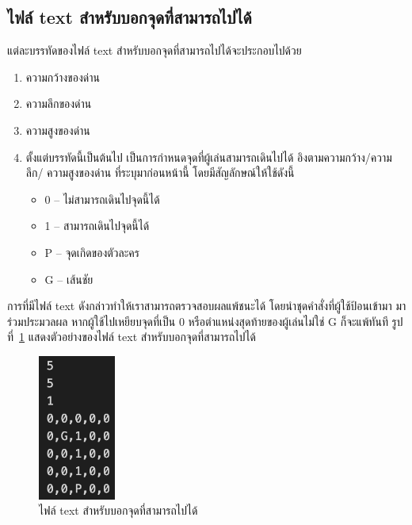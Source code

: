 \subsection{ไฟล์ text สำหรับบอกจุดที่สามารถไปได้}
แต่ละบรรทัดของไฟล์ text สำหรับบอกจุดที่สามารถไปได้จะประกอบไปด้วย
\begin{enumerate}
    \item ความกว้างของด่าน
    \item ความลึกของด่าน
    \item ความสูงของด่าน
    \item ตั้งแต่บรรทัดนี้เป็นต้นไป เป็นการกำหนดจุดที่ผู้เล่นสามารถเดินไปได้ อิงตามความกว้าง/ความลึก/ \newline ความสูงของด่าน ที่ระบุมาก่อนหน้านี้ โดยมีสัญลักษณ์ให้ใช้ดังนี้
    \begin{itemize}
        \item 0 -- ไม่สามารถเดินไปจุดนี้ได้
        \item 1 -- สามารถเดินไปจุดนี้ได้
        \item P -- จุดเกิดของตัวละคร
        \item G -- เส้นชัย
    \end{itemize}
\end{enumerate}
การที่มีไฟล์ text ดังกล่าวทำให้เราสามารถตรวจสอบผลแพ้ชนะได้ โดยนำชุดคำสั่งที่ผู้ใช้ป้อนเข้ามา มาร่วมประมวลผล หากผู้ใช้ไปเหยียบจุดที่เป็น 0
หรือตำแหน่งสุดท้ายของผู้เล่นไม่ใช่ G ก็จะแพ้ทันที รูปที่~\ref{ft2} แสดงตัวอย่างของไฟล์ text สำหรับบอกจุดที่สามารถไปได้
\begin{figure}[H]
    \begin{center}
    \includegraphics[width=1in]{pic-toro/filetext1.png}
    \end{center}
    \caption[ไฟล์ text สำหรับบอกจุดที่สามารถไปได้]{ไฟล์ text สำหรับบอกจุดที่สามารถไปได้}
    \label{ft2}
    \end{figure}
